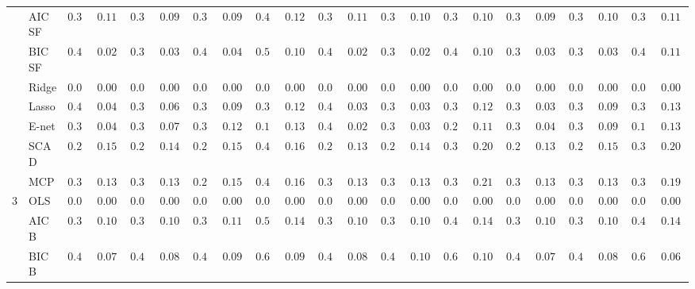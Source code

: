 \begin{tabular}{ll|ll|llllll|llllll|llllll}
 & AIC SF  & $0.326$ & $0.1125$ & $0.336$ & $0.0980$ & $0.338$ & $0.0930$ & $0.448$ & $0.1210$ & $0.318$ & $0.1140$ & $0.344$ & $0.1028$ & $0.378$ & $0.1097$ & $0.344$ & $0.0946$ & $0.340$ & $0.1005$ & $0.370$ & $0.1150$ \\
 & BIC SF  & $0.400$ & $0.0284$ & $0.392$ & $0.0394$ & $0.402$ & $0.0449$ & $0.506$ & $0.1043$ & $0.400$ & $0.0284$ & $0.396$ & $0.0281$ & $0.496$ & $0.1082$ & $0.392$ & $0.0394$ & $0.394$ & $0.0343$ & $0.494$ & $0.1118$ \\
 & Ridge  & $0.000$ & $0.0000$ & $0.000$ & $0.0000$ & $0.000$ & $0.0000$ & $0.000$ & $0.0000$ & $0.000$ & $0.0000$ & $0.000$ & $0.0000$ & $0.000$ & $0.0000$ & $0.000$ & $0.0000$ & $0.000$ & $0.0000$ & $0.000$ & $0.0000$ \\
 & Lasso  & $0.400$ & $0.0402$ & $0.382$ & $0.0642$ & $0.340$ & $0.0964$ & $0.342$ & $0.1281$ & $0.402$ & $0.0348$ & $0.394$ & $0.0343$ & $0.322$ & $0.1203$ & $0.392$ & $0.0394$ & $0.354$ & $0.0937$ & $0.320$ & $0.1393$ \\
 & E-net  & $0.396$ & $0.0400$ & $0.368$ & $0.0790$ & $0.308$ & $0.1220$ & $0.186$ & $0.1311$ & $0.400$ & $0.0284$ & $0.392$ & $0.0394$ & $0.282$ & $0.1140$ & $0.388$ & $0.0477$ & $0.342$ & $0.0997$ & $0.198$ & $0.1348$ \\
 & SCAD  & $0.264$ & $0.1501$ & $0.280$ & $0.1421$ & $0.278$ & $0.1501$ & $0.446$ & $0.1654$ & $0.280$ & $0.1363$ & $0.276$ & $0.1471$ & $0.320$ & $0.2089$ & $0.276$ & $0.1386$ & $0.286$ & $0.1511$ & $0.312$ & $0.2016$ \\
 & MCP  & $0.308$ & $0.1376$ & $0.316$ & $0.1369$ & $0.292$ & $0.1542$ & $0.448$ & $0.1660$ & $0.318$ & $0.1336$ & $0.302$ & $0.1378$ & $0.324$ & $0.2104$ & $0.312$ & $0.1373$ & $0.316$ & $0.1339$ & $0.330$ & $0.1977$ \\\hline
3 & OLS  & $0.000$ & $0.0000$ & $0.000$ & $0.0000$ & $0.000$ & $0.0000$ & $0.000$ & $0.0000$ & $0.000$ & $0.0000$ & $0.000$ & $0.0000$ & $0.000$ & $0.0000$ & $0.000$ & $0.0000$ & $0.000$ & $0.0000$ & $0.000$ & $0.0000$ \\
 & AIC B  & $0.338$ & $0.1013$ & $0.326$ & $0.1050$ & $0.354$ & $0.1132$ & $0.504$ & $0.1435$ & $0.324$ & $0.1093$ & $0.338$ & $0.1052$ & $0.438$ & $0.1469$ & $0.328$ & $0.1083$ & $0.350$ & $0.1040$ & $0.458$ & $0.1485$ \\
 & BIC B  & $0.430$ & $0.0718$ & $0.436$ & $0.0823$ & $0.468$ & $0.0952$ & $0.652$ & $0.0926$ & $0.448$ & $0.0858$ & $0.454$ & $0.1058$ & $0.600$ & $0.1025$ & $0.422$ & $0.0799$ & $0.452$ & $0.0882$ & $0.606$ & $0.0600$ \\

\end{tabular}
